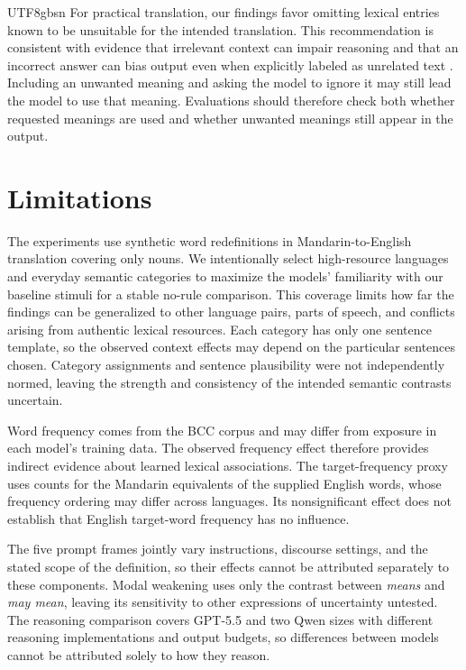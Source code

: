 \documentclass[11pt]{article}
\begin{document}
\begin{CJK*}{UTF8}{gbsn}
For practical translation, our findings favor omitting lexical entries known to be unsuitable for the intended translation. This recommendation is consistent with evidence that irrelevant context can impair reasoning \citep{shi2023distracted} and that an incorrect answer can bias output even when explicitly labeled as unrelated text \citep{kortukov2024documents}. Including an unwanted meaning and asking the model to ignore it may still lead the model to use that meaning. Evaluations should therefore check both whether requested meanings are used and whether unwanted meanings still appear in the output.

\section*{Limitations}

The experiments use synthetic word redefinitions in Mandarin-to-English translation covering only nouns. We intentionally select high-resource languages and everyday semantic categories to maximize the models' familiarity with our baseline stimuli for a stable no-rule comparison. This coverage limits how far the findings can be generalized to other language pairs, parts of speech, and conflicts arising from authentic lexical resources. Each category has only one sentence template, so the observed context effects may depend on the particular sentences chosen. Category assignments and sentence plausibility were not independently normed, leaving the strength and consistency of the intended semantic contrasts uncertain.

Word frequency comes from the BCC corpus and may differ from exposure in each model's training data. The observed frequency effect therefore provides indirect evidence about learned lexical associations. The target-frequency proxy uses counts for the Mandarin equivalents of the supplied English words, whose frequency ordering may differ across languages. Its nonsignificant effect does not establish that English target-word frequency has no influence.

The five prompt frames jointly vary instructions, discourse settings, and the stated scope of the definition, so their effects cannot be attributed separately to these components. Modal weakening uses only the contrast between \emph{means} and \emph{may mean}, leaving its sensitivity to other expressions of uncertainty untested. The reasoning comparison covers GPT-5.5 and two Qwen sizes with different reasoning implementations and output budgets, so differences between models cannot be attributed solely to how they reason.


\end{CJK*}
\end{document}
